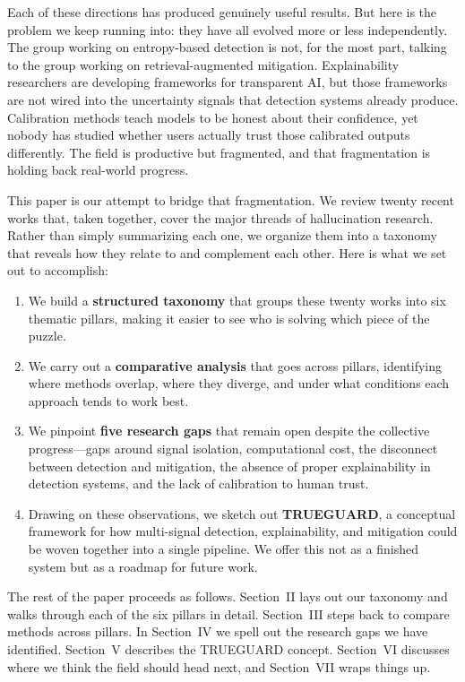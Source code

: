 \documentclass[journal]{IEEEtran}
\begin{document}
Each of these directions has produced genuinely useful results. But here is the problem we keep running into: they have all evolved more or less independently. The group working on entropy-based detection is not, for the most part, talking to the group working on retrieval-augmented mitigation. Explainability researchers are developing frameworks for transparent AI, but those frameworks are not wired into the uncertainty signals that detection systems already produce. Calibration methods teach models to be honest about their confidence, yet nobody has studied whether users actually trust those calibrated outputs differently. The field is productive but fragmented, and that fragmentation is holding back real-world progress.

This paper is our attempt to bridge that fragmentation. We review twenty recent works that, taken together, cover the major threads of hallucination research. Rather than simply summarizing each one, we organize them into a taxonomy that reveals how they relate to and complement each other. Here is what we set out to accomplish:

\begin{enumerate}
\item We build a \textbf{structured taxonomy} that groups these twenty works into six thematic pillars, making it easier to see who is solving which piece of the puzzle.

\item We carry out a \textbf{comparative analysis} that goes across pillars, identifying where methods overlap, where they diverge, and under what conditions each approach tends to work best.

\item We pinpoint \textbf{five research gaps} that remain open despite the collective progress---gaps around signal isolation, computational cost, the disconnect between detection and mitigation, the absence of proper explainability in detection systems, and the lack of calibration to human trust.

\item Drawing on these observations, we sketch out \textbf{TRUEGUARD}, a conceptual framework for how multi-signal detection, explainability, and mitigation could be woven together into a single pipeline. We offer this not as a finished system but as a roadmap for future work.
\end{enumerate}

The rest of the paper proceeds as follows. Section~II lays out our taxonomy and walks through each of the six pillars in detail. Section~III steps back to compare methods across pillars. In Section~IV we spell out the research gaps we have identified. Section~V describes the TRUEGUARD concept. Section~VI discusses where we think the field should head next, and Section~VII wraps things up.
\end{document}
